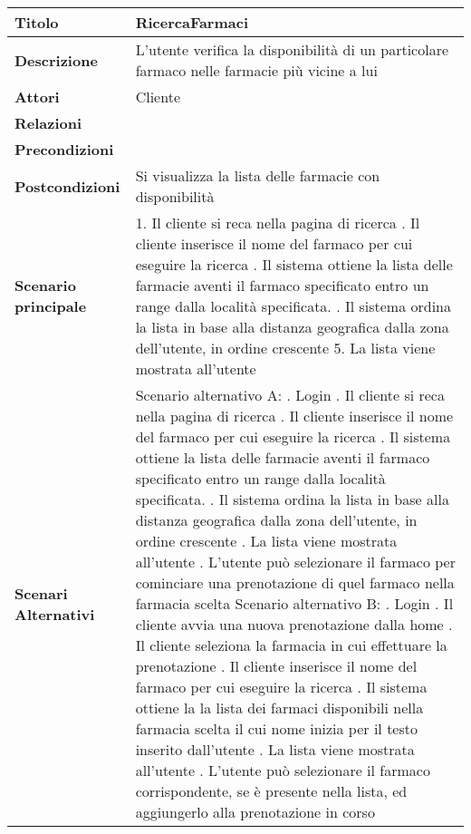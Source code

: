 \begin{tabular} {|P{4.5cm}|P{12.5cm}|}
\hline
  \textbf{Titolo} & RicercaFarmaci\\
\hline
  \textbf{Descrizione} & L'utente verifica la disponibilità di un particolare farmaco nelle farmacie più vicine a lui\\
\hline
  \textbf{Attori} & Cliente\\
\hline
  \textbf{Relazioni} &\\
\hline
  \textbf{Precondizioni} &\\
\hline
  \textbf{Postcondizioni} & Si visualizza la lista delle farmacie con disponibilità\\
\hline
  \textbf{Scenario principale} & 1. Il cliente si reca nella pagina di ricerca . Il cliente inserisce il nome del farmaco per cui eseguire la ricerca . Il sistema ottiene la lista delle farmacie aventi il farmaco specificato entro un range dalla località specificata. . Il sistema ordina la lista in base alla distanza geografica dalla zona dell'utente, in ordine crescente 5. La lista viene mostrata all'utente\\
\hline
  \textbf{Scenari Alternativi} & Scenario alternativo A: . Login . Il cliente si reca nella pagina di ricerca . Il cliente inserisce il nome del farmaco per cui eseguire la ricerca . Il sistema ottiene la lista delle farmacie aventi il farmaco specificato entro un range dalla località specificata. . Il sistema ordina la lista in base alla distanza geografica dalla zona dell'utente, in ordine crescente . La lista viene mostrata all'utente . L'utente può selezionare il farmaco per cominciare una prenotazione di quel farmaco nella farmacia scelta \linebreak Scenario alternativo B: .  Login . Il cliente avvia una nuova prenotazione dalla home . Il cliente seleziona la farmacia in cui effettuare la prenotazione . Il cliente inserisce il nome del farmaco per cui eseguire la ricerca . Il sistema ottiene la la lista dei farmaci disponibili nella farmacia scelta il cui nome inizia per il testo inserito dall'utente . La lista viene mostrata all'utente . L'utente può selezionare il farmaco corrispondente, se è presente nella lista, ed aggiungerlo alla prenotazione in corso\\

\end{tabular}
